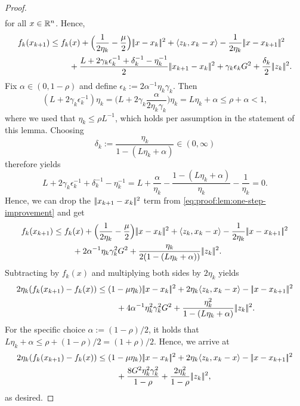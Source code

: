 \begin{proof}
\begin{align*}
    \end{align*}
    for all $x\in\mathbb{R}^n$. Hence,
    \begin{align}
        \label{eq:proof:lem:one-step-improvement}
        f_k(x_{k+1})
        &\leq f_k(x) + \Big( \frac{1}{2\eta_k} - \frac{\mu}{2} \Big) \norm{x - x_k}^2 + \langle z_k, x_k - x \rangle 
            - \frac{1}{2\eta_k}\norm{x - x_{k+1}}^2 \notag \\
        &\phantom{===} + \frac{L + 2\gamma_k\epsilon_k^{-1} + \delta_k^{-1} - \eta_k^{-1}}{2} \norm{x_{k+1} - x_k}^2
            + \gamma_k \epsilon_k G^2 + \frac{\delta_k}{2} \norm{z_k}^2.
    \end{align}
    Fix $\alpha \in (0, 1 - \rho)$ and define $\epsilon_k := 2\alpha^{-1}\eta_k\gamma_k$. Then
    \[
        (L + 2\gamma_k\epsilon_k^{-1})\eta_k
        = \Big( L + 2\gamma_k \frac{\alpha}{2 \eta_k \gamma_k} \Big)\eta_k
        = L\eta_k + \alpha \leq \rho + \alpha < 1,
    \]
    where we used that $\eta_k \leq \rho L^{-1}$, which holds per assumption in the statement of this lemma.
    Choosing
    \[
        \delta_k := \frac{\eta_k}{1 - (L\eta_k + \alpha)} \in (0,\infty)
    \]
    therefore yields
    \[
        L + 2\gamma_k\epsilon_k^{-1} + \delta_k^{-1} - \eta_k^{-1}
        = L + \frac{\alpha}{\eta_k} - \frac{1 - (L\eta_k + \alpha)}{\eta_k} - \frac{1}{\eta_k}
        = 0.
    \]
    Hence, we can drop the $|\!|x_{k+1} - x_k|\!|^2$ term from \eqref{eq:proof:lem:one-step-improvement} and get
    \begin{align*}
        f_k(x_{k+1})
        &\leq f_k(x) + \Big(\frac{1}{2\eta_k} - \frac{\mu}{2}\Big)|\!|x - x_k|\!|^2 + \langle z_k, x_k - x \rangle 
            - \frac{1}{2\eta_k}|\!|x - x_{k+1}|\!|^2 \\
        &\phantom{===} + 2 \alpha^{-1} \eta_k \gamma_k^2 G^2 + \frac{\eta_k}{2(1 - (L\eta_k + \alpha))}|\!|z_k|\!|^2.
    \end{align*}
    Subtracting by $f_k(x)$ and multiplying both sides by $2\eta_k$
    yields
    \begin{align*}
        2\eta_k(f_k(x_{k+1}) - f_k(x))
        &\leq ( 1 - \mu\eta_k ) |\!|x - x_k|\!|^2 + 2\eta_k\langle z_k, x_k - x \rangle 
            - |\!|x - x_{k+1}|\!|^2 \\
        &\phantom{===} + 4 \alpha^{-1} \eta_k^2 \gamma_k^2 G^2 + \frac{\eta_k^2}{1 - (L\eta_k + \alpha)}|\!|z_k|\!|^2.
    \end{align*}
    For the specific choice $\alpha := (1 - \rho)/2$, it holds that $L\eta_k + \alpha \leq \rho + (1 - \rho)/2 = (1 + \rho)/2$.
    Hence, we arrive at
    \begin{align*}
        2\eta_k(f_k(x_{k+1}) - f_k(x))
        &\leq ( 1 - \mu\eta_k ) |\!|x - x_k|\!|^2 + 2\eta_k\langle z_k, x_k - x \rangle 
            - |\!|x - x_{k+1}|\!|^2 \notag \\
        &\phantom{===} +  \frac{8 G^2\eta_k^2\gamma_k^2}{1 - \rho} + \frac{2\eta_k^2}{1 - \rho}|\!|z_k|\!|^2,
    \end{align*}
    as desired.
\end{proof}
